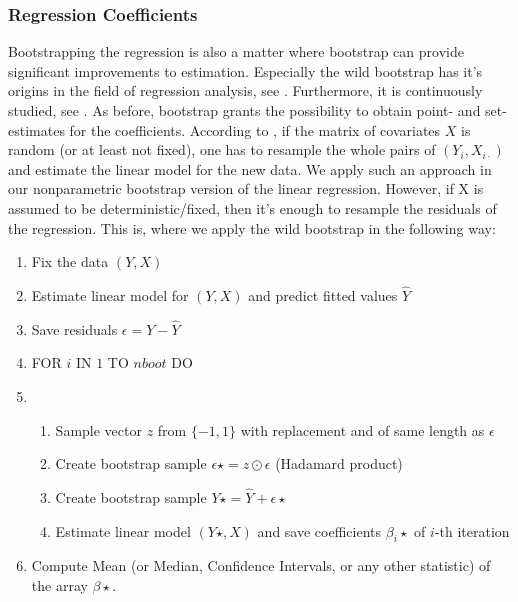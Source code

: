 	\subsubsection*{Regression Coefficients}
Bootstrapping the regression is also a matter where bootstrap can provide significant improvements to estimation. Especially the wild bootstrap has it's origins in the field of regression analysis, see \citet{wboot1}. Furthermore, it is continuously studied, see \citet{wboot2}. As before, bootstrap grants the possibility to obtain point- and set-estimates for the coefficients. According to \citet{regression}, if the matrix of covariates $X$ is random (or at least not fixed), one has to resample the whole pairs of $(Y_i, X_{i\cdot})$ and estimate the linear model for the new data. We apply such an approach in our nonparametric bootstrap version of the linear regression. However, if X is assumed to be deterministic/fixed, then it's enough to resample the residuals of the regression. This is, where we apply the wild bootstrap in the following way:
\begin{enumerate}
	\item Fix the data $(Y, X)$
	\item Estimate linear model for $(Y, X)$ and predict fitted values $\hat{Y}$
	\item Save residuals $\epsilon = Y - \hat{Y}$
	\item FOR $i$ IN $1$ TO $nboot$ DO
	\item \begin{enumerate}
		\item Sample vector $z$ from $\{-1,1\}$ with replacement and of same length as $\epsilon$
		\item Create bootstrap sample $\epsilon\star = z \odot \epsilon$ (Hadamard product)
		\item Create bootstrap sample $Y\star = \hat{Y} + \epsilon\star$
		\item Estimate linear model $(Y\star, X)$ and save coefficients $\beta_i\star$ of $i$-th iteration
	\end{enumerate}
	\item Compute Mean (or Median, Confidence Intervals, or any other statistic) of the array $\beta\star$.
\end{enumerate}
